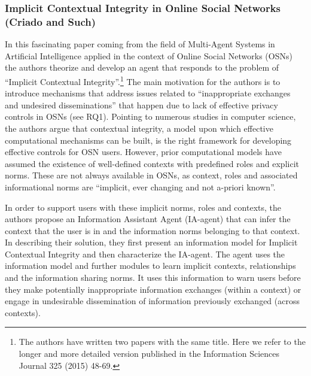 \documentclass[../thesis.tex]{subfiles}
\begin{document}
\subsubsection{Implicit Contextual Integrity in Online Social Networks (Criado
  and Such)}
\label{CI3.3.3}

In this fascinating paper coming from the field of Multi-Agent Systems
in Artificial Intelligence applied in the context of Online Social
Networks (OSNs) the authors theorize and develop an agent that responds
to the problem of ``Implicit Contextual
Integrity''.\footnote{ The authors have written two
papers with the same title. Here we refer to the longer and more
detailed version published in the Information Sciences Journal 325
(2015) 48-69. } The main motivation for the authors is to introduce
mechanisms that address issues related to
``inappropriate exchanges and undesired
disseminations'' that happen due to lack of effective
privacy controls in OSNs (see RQ1). Pointing to numerous studies in
computer science, the authors argue that contextual integrity, a model
upon which effective computational mechanisms can be built, is the
right framework for developing effective controls for OSN users.
However, prior computational models have assumed the existence of
well-defined contexts with predefined roles and explicit norms. These
are not always available in OSNs, as context, roles and associated
informational norms are ``implicit, ever changing and
not a-priori known''.

In order to support users with these implicit norms, roles and contexts,
the authors propose an Information Assistant Agent (IA-agent) that can
infer the context that the user is in and the information norms
belonging to that context. In describing their solution, they first
present an information model for Implicit Contextual Integrity and then
characterize the IA-agent. The agent uses the information model and
further modules to learn implicit contexts, relationships and the
information sharing norms. It uses this information to warn users
before they make potentially inappropriate information exchanges
(within a context) or engage in undesirable dissemination of
information previously exchanged (across contexts). 
\end{document}
